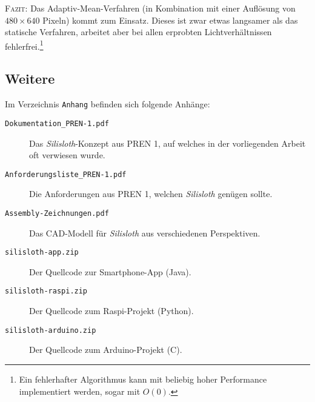 \textsc{Fazit}: Das Adaptiv-Mean-Verfahren (in Kombination mit einer Auflösung von $480 \times 640$ Pixeln) kommt zum Einsatz. Dieses ist zwar etwas langsamer als das statische Verfahren, arbeitet aber bei allen erprobten Lichtverhältnissen fehlerfrei.\footnote{Ein fehlerhafter Algorithmus kann mit beliebig hoher Performance implementiert werden, sogar mit $O(0)$.}

\subsection{Weitere}

Im Verzeichnis \texttt{Anhang} befinden sich folgende Anhänge:

\begin{description}
    \item[\texttt{Dokumentation\_PREN-1.pdf}] Das \textit{Silisloth}-Konzept aus PREN 1, auf welches in der vorliegenden Arbeit oft verwiesen wurde.
    \item[\texttt{Anforderungsliste\_PREN-1.pdf}] Die Anforderungen aus PREN 1, welchen \textit{Silisloth} genügen sollte.
    \item[\texttt{Assembly-Zeichnungen.pdf}] Das CAD-Modell für \textit{Silisloth} aus verschiedenen Perspektiven.
    \item[\texttt{silisloth-app.zip}] Der Quellcode zur Smartphone-App (Java).
    \item[\texttt{silisloth-raspi.zip}] Der Quellcode zum Raspi-Projekt (Python).
    \item[\texttt{silisloth-arduino.zip}] Der Quellcode zum Arduino-Projekt (C).
\end{description}
